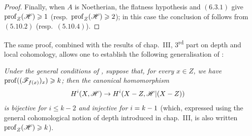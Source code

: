 \begin{proof}
Finally, when $A$ is Noetherian, the flatness hypothesis and $(6.3.1)$ give $\operatorname{prof}_Z(\mathscr{H})\geqslant1$ (resp.\ $\operatorname{prof}_Z(\mathscr{H})\geqslant2$); in this case the conclusion of  follows from $(5.10.2)$ (resp.\ $(5.10.4)$).
\end{proof}

\begin{remark}[19.9.9]
\label{IV.19.9.9}
The same proof, combined with the results of chap.~III, 3\textsuperscript{rd} part on depth and local cohomology, allows one to establish the following generalisation of :

\emph{Under the general conditions of , suppose that, for every $x\in Z$, we have $\operatorname{prof}((\mathscr{F}_{f(x)})_x)\geqslant k$; then the canonical homomorphism}
\[
  H^i(X,\mathscr{H})\to H^i(X-Z,\mathscr{H}|(X-Z))
\]
\emph{is bijective for $i\leqslant k-2$ and injective for $i=k- 1$} (which, expressed using the general cohomological notion of depth introduced in chap.~III, is also written $\operatorname{prof}_Z(\mathscr{H})\geqslant k$).
\end{remark}
